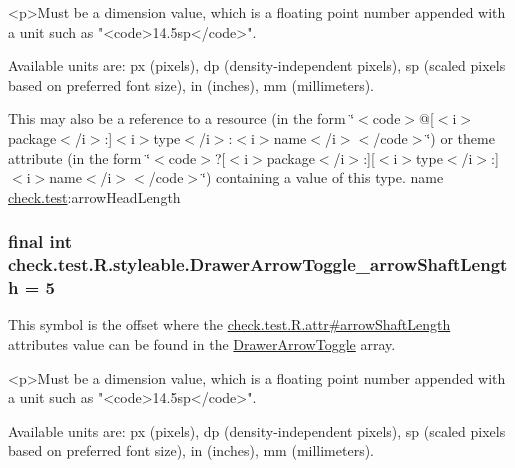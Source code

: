 \begin{DoxyVerb}      <p>Must be a dimension value, which is a floating point number appended with a unit such as "<code>14.5sp</code>".
\end{DoxyVerb}
 Available units are\+: px (pixels), dp (density-\/independent pixels), sp (scaled pixels based on preferred font size), in (inches), mm (millimeters). 

This may also be a reference to a resource (in the form \char`\"{}$<$code$>$@\mbox{[}$<$i$>$package$<$/i$>$\+:\mbox{]}$<$i$>$type$<$/i$>$\+:$<$i$>$name$<$/i$>$$<$/code$>$\char`\"{}) or theme attribute (in the form \char`\"{}$<$code$>$?\mbox{[}$<$i$>$package$<$/i$>$\+:\mbox{]}\mbox{[}$<$i$>$type$<$/i$>$\+:\mbox{]}$<$i$>$name$<$/i$>$$<$/code$>$\char`\"{}) containing a value of this type.  name \hyperlink{namespacecheck_1_1test}{check.\+test}\+:arrow\+Head\+Length \hypertarget{classcheck_1_1test_1_1_r_1_1styleable_a5470f2b363de031a61f66e7cb6730f40}{}
\subsubsection[{Drawer\+Arrow\+Toggle\+\_\+arrow\+Shaft\+Length}]{\setlength{\rightskip}{0pt plus 5cm}final int check.\+test.\+R.\+styleable.\+Drawer\+Arrow\+Toggle\+\_\+arrow\+Shaft\+Length = 5\hspace{0.3cm}{\ttfamily [static]}}\label{classcheck_1_1test_1_1_r_1_1styleable_a5470f2b363de031a61f66e7cb6730f40}
This symbol is the offset where the \hyperlink{classcheck_1_1test_1_1_r_1_1attr_a42ef32908e93c3a8cc585d62eb217255}{check.\+test.\+R.\+attr\#arrow\+Shaft\+Length} attribute\textquotesingle{}s value can be found in the \hyperlink{classcheck_1_1test_1_1_r_1_1styleable_a3bd2348d01049d5d42d5b7f277abeec9}{Drawer\+Arrow\+Toggle} array.

\begin{DoxyVerb}      <p>Must be a dimension value, which is a floating point number appended with a unit such as "<code>14.5sp</code>".
\end{DoxyVerb}
 Available units are\+: px (pixels), dp (density-\/independent pixels), sp (scaled pixels based on preferred font size), in (inches), mm (millimeters). 

